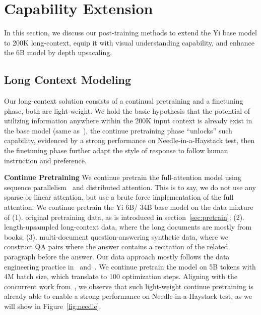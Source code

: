 \documentclass[numbers,sort&compress]{article}
\begin{document}
\section{Capability Extension}
In this section, we discuss our post-training methods to extend the Yi base model to 200K long-context, equip it with visual understanding capability, and enhance the 6B model by depth upsacaling.

\subsection{Long Context Modeling}
\label{sec:long_context}
Our long-context solution consists of a continual pretraining and a finetuning phase, both are light-weight.
We hold the basic hypothesis that the potential of utilizing information anywhere within the 200K input context is already 
exist in the base model (same as~\citealt{fu2024data}), the continue pretraining phase ``unlocks'' such capability, evidenced by a strong performance on Needle-in-a-Haystack test, then the finetuning phase further adapt the style of response to follow human instruction and preference. 

\textbf{Continue Pretraining}\quad
We continue pretrain the full-attention model using sequence parallelism~\citep{li2021sequence} and distributed attention.
This is to say, we do not use any sparse or linear attention, but use a brute force implementation of the full attention.
We continue pretrain the Yi 6B/ 34B base model on the data mixture of 
(1). original pretraining data, as is introduced in section~\ref{sec:pretrain}; 
(2). length-upsampled long-context data, where the long documents are mostly from books; 
(3). multi-document question-answering synthetic data, where we construct QA pairs where the answer contains a recitation of the related paragraph before the answer. 
Our data approach mostly follows the data engineering practice in~\citet{fu2024data} and~\citet{yu2023paraphrasing}. 
We continue pretrain the model on 5B tokens with 4M batch size, which translate to 100 optimization steps.
Aligning with the concurrent work from~\citet{fu2024data}, we observe that such light-weight continue pretraining is already able to enable a strong performance on Needle-in-a-Haystack test, as we will show in Figure~\ref{fig:needle}. 
\end{document}
